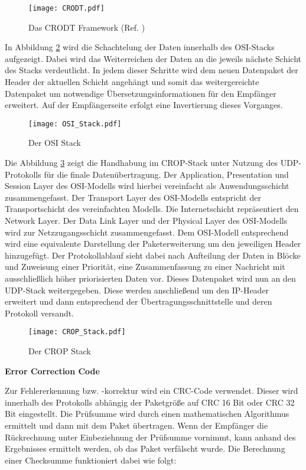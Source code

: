 \begin{figure}[H]
\centering
\texttt{[image: CRODT.pdf]}
\caption{Das CRODT Framework (Ref. \cite{Daher})}
\label{fig:CRODT}
\end{figure}

In Abbildung \ref{fig:OSI_Stack} wird die Schachtelung der Daten
innerhalb des OSI-Stacks aufgezeigt. Dabei wird das Weiterreichen der Daten an
die jeweils n{\"a}chste Schicht des Stacks verdeutlicht. In jedem dieser Schritte wird dem neuen
Datenpaket der Header der aktuellen Schicht angeh{\"a}ngt und somit das
weitergereichte Datenpaket um notwendige {\"U}bersetzungsinformationen f{\"u}r
den Empf{\"a}nger erweitert. Auf der Empf{\"a}ngerseite erfolgt eine Invertierung dieses
Vorganges. 

\begin{figure}[H]
\centering
\texttt{[image: OSI\_Stack.pdf]}
\caption{Der OSI Stack}
\label{fig:OSI_Stack}
\end{figure}
 
Die Abbildung \ref{fig:CROP_Stack} zeigt die Handhabung im CROP-Stack
unter Nutzung des \gls{UDP}-Protokolls f{\"u}r die finale Daten{\"u}bertragung. Der
Application, Presentation und Session Layer des OSI-Modells
wird hierbei vereinfacht als Anwendungsschicht zusammengefasst.
Der Transport Layer des OSI-Modells entspricht der Transportschicht des
vereinfachten Modells. Die Internetschicht repr{\"a}sentiert den Network
Layer.
Der Data Link Layer und der Physical Layer des OSI-Modells wird zur
Netzzugangsschicht zusammengefasst. Dem OSI-Modell entsprechend wird eine
equivalente Darstellung der Paketerweiterung um den jeweiligen Header
hinzugef{\"u}gt. Der Protokollablauf sieht dabei nach Aufteilung der Daten in
Bl{\"o}cke und Zuweisung einer Priorit{\"a}t, eine Zusammenfassung zu einer
Nachricht mit ausschließlich höher priorisierten Daten vor. Dieses Datenpaket
wird nun an den \gls{UDP}-Stack weitergegeben. Diese werden
anschlie{\ss}end um den \gls{IP}-Header erweitert und dann entsprechend
der {\"U}bertragungsschnittstelle und deren Protokoll versandt.

\begin{figure}[H]
\centering
\texttt{[image: CROP\_Stack.pdf]}
\caption{Der CROP Stack}
\label{fig:CROP_Stack}
\end{figure}

\textbf{Error Correction Code}

Zur Fehlererkennung bzw. -korrektur wird ein CRC-Code verwendet. Dieser wird
innerhalb des Protokolls abhängig der Paketgr{\"o}{\ss}e auf CRC 16 Bit oder
CRC 32 Bit eingestellt. Die Pr{\"u}fsumme wird durch einen mathematischen
Algorithmus ermittelt und dann mit dem Paket {\"u}bertragen. Wenn der
Empf{\"a}nger die R{\"u}ckrechnung unter Einbeziehnung der Pr{\"u}fsumme
vornimmt, kann anhand des Ergebnisses ermittelt werden, ob das Paket
verf{\"a}lscht wurde. Die Berechnung einer Checksumme funktioniert dabei wie
folgt:

